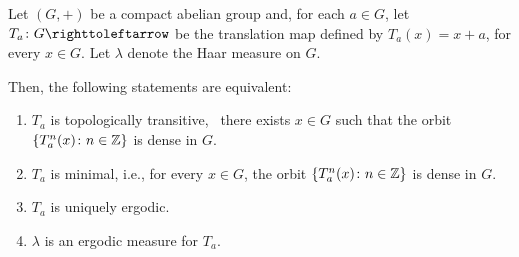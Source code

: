 \begin{theorem}
  \label{thm:minimal-translations-on-groups}
  Let $(G,+)$ be a compact abelian group and, for each $a\in G$, let $T_a\colon G\carr$ be the translation map defined by $T_a(x)=x+a$, for every $x\in G$. Let $\lambda$ denote the Haar measure on $G$.

  Then, the following statements are equivalent:
  \begin{enumerate}
    \item $T_a$ is topologically transitive, \ie~there exists $x\in G$ such that the orbit $\{T_a^n(x)\colon n\in\mathbb{Z}\}$ is dense in $G$.
    \item $T_a$ is minimal, i.e., for every $x\in G$, the orbit $\{T_a^n(x)\colon n\in\mathbb{Z}\}$ is dense in $G$.
    \item $T_a$ is uniquely ergodic.
    \item $\lambda$ is an ergodic measure for $T_a$.
  \end{enumerate}
\end{theorem}

